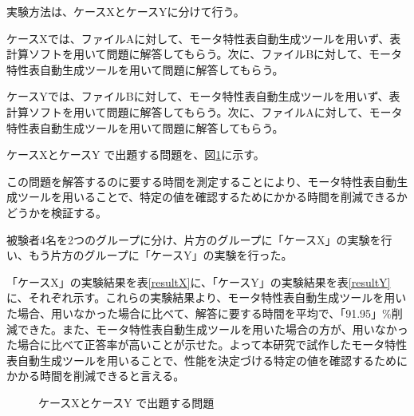 \documentclass[uplatex, 10pt, a4p]{jsarticle}
\begin{document}
実験方法は、ケースXとケースYに分けて行う。

ケースXでは、ファイルAに対して、モータ特性表自動生成ツールを用いず、表計算ソフトを用いて問題に解答してもらう。次に、ファイルBに対して、モータ特性表自動生成ツールを用いて問題に解答してもらう。

ケースYでは、ファイルBに対して、モータ特性表自動生成ツールを用いず、表計算ソフトを用いて問題に解答してもらう。次に、ファイルAに対して、モータ特性表自動生成ツールを用いて問題に解答してもらう。

ケースXとケースY で出題する問題を、図\ref{fig:mondai}に示す。

この問題を解答するのに要する時間を測定することにより、モータ特性表自動生成ツールを用いることで、特定の値を確認するためにかかる時間を削減できるかどうかを検証する。

被験者4名を2つのグループに分け、片方のグループに「ケースX」の実験を行い、もう片方のグループに「ケースY」の実験を行った。

「ケースX」の実験結果を表\ref{resultX}に、「ケースY」の実験結果を表\ref{resultY}に、それぞれ示す。これらの実験結果より、モータ特性表自動生成ツールを用いた場合、用いなかった場合に比べて、解答に要する時間を平均で、「91.95」\%削減できた。また、モータ特性表自動生成ツールを用いた場合の方が、用いなかった場合に比べて正答率が高いことが示せた。よって本研究で試作したモータ特性表自動生成ツールを用いることで、性能を決定づける特定の値を確認するためにかかる時間を削減できると言える。

\begin{figure}[tp]
	\centering
	\caption{ケースXとケースY で出題する問題}
	\label{fig:mondai}
\end{figure}
\end{document}
